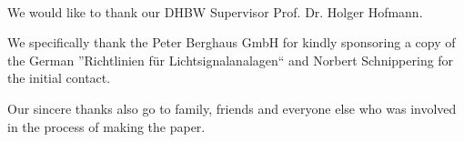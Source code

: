 \vspace{3cm}
\begingroup
{}\\
\endgroup
\vspace{1.5cm}

We would like to thank our DHBW Supervisor Prof. Dr. Holger Hofmann.

We specifically thank the Peter Berghaus GmbH for kindly sponsoring a copy of the German ''Richtlinien für Lichtsignalanalagen`` and Norbert Schnippering for the initial contact.

Our sincere thanks also go to family, friends and everyone else who was involved in the process of making the paper.